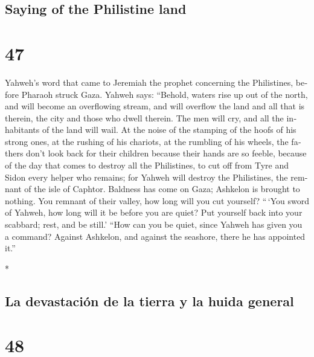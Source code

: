 \begin{paracol}{2}
\switchcolumn
\begin{otherlanguage}{english}

\hypertarget{saying-of-the-philistine-land}{%
\subsection{Saying of the Philistine
land}\label{saying-of-the-philistine-land}}

\hypertarget{section-93}{%
\section{47}\label{section-93}}

 Yahweh's word that came to Jeremiah the prophet
concerning the Philistines, before Pharaoh struck Gaza. 
Yahweh says: ``Behold, waters rise up out of the north, and will become
an overflowing stream, and will overflow the land and all that is
therein, the city and those who dwell therein. The men will cry, and all
the inhabitants of the land will wail.  At the noise of
the stamping of the hoofs of his strong ones, at the rushing of his
chariots, at the rumbling of his wheels, the fathers don't look back for
their children because their hands are so feeble,  because
of the day that comes to destroy all the Philistines, to cut off from
Tyre and Sidon every helper who remains; for Yahweh will destroy the
Philistines, the remnant of the isle of Caphtor.  Baldness
has come on Gaza; Ashkelon is brought to nothing. You remnant of their
valley, how long will you cut yourself?  ``\,`You sword of
Yahweh, how long will it be before you are quiet? Put yourself back into
your scabbard; rest, and be still.'  ``How can you be
quiet, since Yahweh has given you a command? Against Ashkelon, and
against the seashore, there he has appointed it.''

\end{otherlanguage}

\switchcolumn[0]*

\hypertarget{la-devastaciuxf3n-de-la-tierra-y-la-huida-general}{%
\subsection{La devastación de la tierra y la huida
general}\label{la-devastaciuxf3n-de-la-tierra-y-la-huida-general}}

\hypertarget{section-94}{%
\section{48}\label{section-94}}


\end{paracol}
